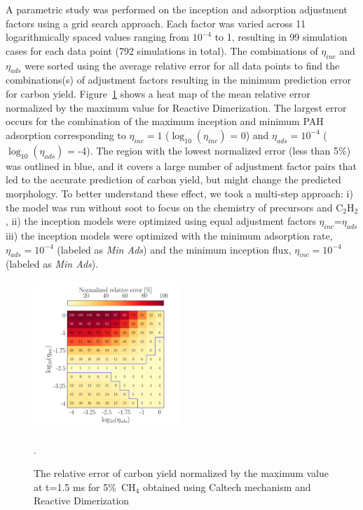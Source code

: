 A parametric study was performed on the inception and adsorption adjustment factors using a grid search approach. Each factor was varied across 11 logarithmically spaced values ranging from $10^{-4}$ to 1, resulting in 99 simulation cases for each data point (792 simulations in total). The combinations of $\eta_{inc}$ and $\eta_{ads}$ were sorted using the average relative error for all data points to find the combinations(s) of adjustment factors resulting in the minimum prediction error for carbon yield. Figure~\ref{fig:shockagof_yielderror_cpr} shows a heat map of the mean relative error normalized by the maximum value for Reactive Dimerization. The largest error occurs for the combination of the maximum inception and minimum PAH adsorption corresponding to  $\eta_{inc}=1$ ($\mathrm{\log_{10}}(\eta_{inc})$ = 0) and $\eta_{ads}=10^{-4}$ ($\mathrm{\log_{10}}(\eta_{ads})$ = -4). The region with the lowest normalized error (less than 5\%) was outlined in blue, and it covers a large number of adjustment factor pairs that led to the accurate prediction of carbon yield, but might change the predicted morphology. To better understand these effect, we took a multi-step approach: i) the model was run without soot to focus on the chemistry of precursors and $\mathrm{C_2H_2}$, ii) the inception models were optimized using equal adjustment factors $\eta_{inc}$=$\eta_{ads}$ iii) the inception models were optimized with the minimum adsorption rate, $\eta_{ads}= 10^{-4}$ (labeled as \textit{Min Ads}) and the minimum inception flux, $\eta_{inc}= 10^{-4}$ (labeled as \textit{Min Ads}).

\begin{figure}[H]
	\centering
	\includegraphics[width=0.5\textwidth]{Figures/Results/Shocktube/Agafonov2016_cpr/5CH4_norm_yield_error_readim.pdf}
	\caption{The relative error of carbon yield normalized by the maximum value at t=1.5 ms for 5\%~$\mathrm{CH_4}$ obtained using Caltech mechanism and Reactive Dimerization}.
	\label{fig:shockagof_yielderror_cpr} 
\end{figure}


